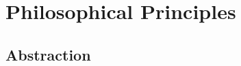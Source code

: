 \chapter{Philosophical Principles}

\section{Abstraction}


\begin{comment}

-Duality
-Definitions, Theorems, Proofs, Conjectures, Experimental Evidence

\end{comment}